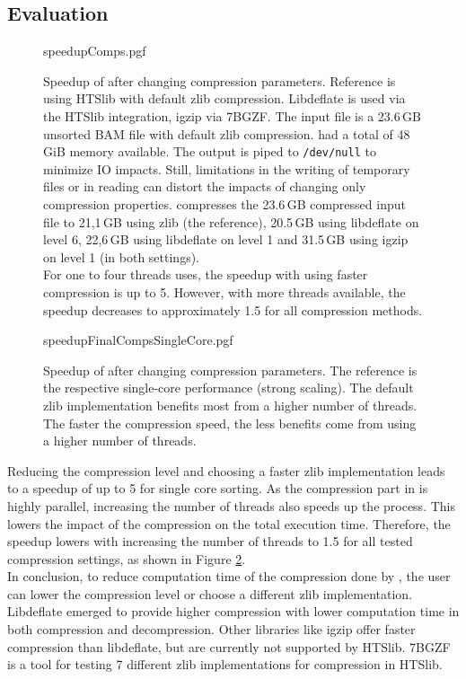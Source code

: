 \subsection{Evaluation}
\begin{figure}[t]
        {speedupComps.pgf}
    \caption{Speedup of \sort after changing compression parameters. Reference is \sort using HTSlib with default zlib compression. Libdeflate is used via the HTSlib integration, igzip via 7BGZF. The input file is a 23.6\,GB unsorted BAM file with default zlib compression. \sort had a total of 48\,GiB memory available. The output is piped to \texttt{/dev/null} to minimize IO impacts. Still, limitations in the writing of temporary files or in reading can distort the impacts of changing only compression properties. \sort compresses the 23.6\,GB compressed input file to 21,1\,GB using zlib (the reference), 20.5\,GB using libdeflate on level 6, 22,6\,GB using libdeflate on level 1 and 31.5\,GB using igzip on level 1 (in both settings). \\
    For one to four threads \sort uses, the speedup with using faster compression is up to 5. However, with more threads available, the speedup decreases to approximately 1.5 for all compression methods.}
    \label{fig:speedupCompression}
\end{figure}
\begin{figure}
        {speedupFinalCompsSingleCore.pgf}
    \caption{Speedup of \sort after changing compression parameters. The reference is the respective single-core performance (strong scaling). The default zlib implementation benefits most from a higher number of threads. The faster the compression speed, the less benefits come from using a higher number of threads.}
    \label{fig:speedupCompression}
\end{figure}
Reducing the compression level and choosing a faster zlib implementation leads to a speedup of up to 5 for single core sorting. As the compression part in \sort is highly parallel, increasing the number of threads also speeds up the process. This lowers the impact of the compression on the total execution time. Therefore, the speedup lowers with increasing the number of threads to 1.5 for all tested compression settings, as shown in Figure \ref{fig:speedupCompression}. \\
In conclusion, to reduce computation time of the compression done by \sort, the user can lower the compression level or choose a different zlib implementation. Libdeflate emerged to provide higher compression with lower computation time in both compression and decompression. Other libraries like igzip offer faster compression than libdeflate, but are currently not supported by HTSlib. 7BGZF is a tool for testing 7 different zlib implementations for compression in HTSlib.



